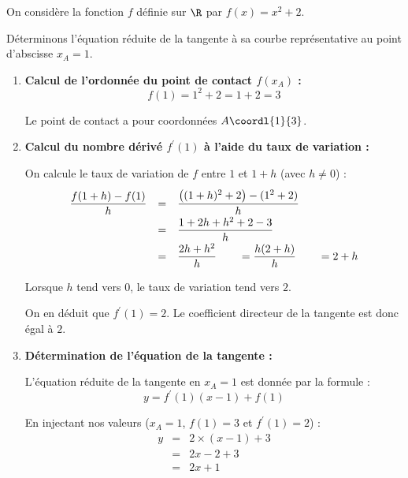 \begin{ex}
	On considère la fonction $f$ définie sur $\R$ par $f(x) = x^2+2$.

	Déterminons l'équation réduite de la tangente à sa courbe représentative au point d'abscisse $x_A = 1$.

	\begin{enumerate}
		\item \textbf{Calcul de l'ordonnée du point de contact $f(x_A)$ :}
		      \[
			      f(1) = 1^2 + 2 = 1 + 2 = 3
		      \]

		      Le point de contact a pour coordonnées $A\coordl{1}{3}$.

		\item \textbf{Calcul du nombre dérivé $f^\prime(1)$ à l'aide du taux de variation :}

		      On calcule le taux de variation de $f$ entre $1$ et $1+h$ (avec $h \neq 0$) :
		      \[
			      \def\arraystretch{2}
			      \begin{array}{rcl}
				      \dfrac{f(1+h)-f(1)}{h} & = & \dfrac{\left((1+h)^2 + 2\right) - (1^2 + 2)}{h}             \\
				                             & = & \dfrac{1 + 2h + h^2 + 2 - 3}{h}                             \\
				                             & = & \dfrac{2h + h^2}{h} \qquad = \dfrac{h(2+h)}{h} \qquad = 2+h
			      \end{array}
		      \]

		      Lorsque $h$ tend vers $0$, le taux de variation tend vers $2$.

		      On en déduit que $f^\prime(1) = 2$. Le coefficient directeur de la tangente est donc égal à $2$.

		\item \textbf{Détermination de l'équation de la tangente :}

		      L'équation réduite de la tangente en $x_A = 1$ est donnée par la formule :
		      \[
			      y = f^\prime(1)(x - 1) + f(1)
		      \]

		      En injectant nos valeurs ($x_A = 1$, $f(1) = 3$ et $f^\prime(1) = 2$) :
		      \[
			      \begin{array}{lcl}
				      y & = & 2 \times (x - 1) + 3 \\
				        & = & 2x - 2 + 3           \\
				        & = & 2x + 1
			      \end{array}
		      \]
	\end{enumerate}


\end{ex}
